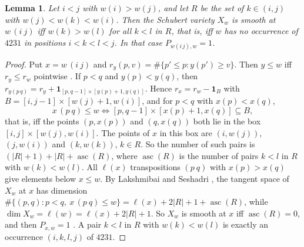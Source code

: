 \documentclass[11pt]{amsart}
\newtheorem{lemma}[theorem]{Lemma}
\theoremstyle{definition}
\theoremstyle{remark}
\begin{document}
\begin{lemma}\label{lem:smoothswap}
Let $i<j$ with $w(i)>w(j)$, and let $R$ be the set of $k\in(i,j)$ with $w(j)<w(k)<w(i)$. Then the Schubert variety $X_w$ is smooth at $w\,(i\ j)$ iff $w(k)>w(l)$ for all $k<l$ in $R$, that is, iff $w$ has no occurrence of $4231$ in positions $i<k<l<j$. In that case $P_{w(i\,j),w}=1$.
\end{lemma}

\begin{proof}
Put $x=w\,(i\ j)$ and $r_y(p,v)=\#\{p'\le p:y(p')\ge v\}$. Then $y\le w$ iff $r_y\le r_w$ pointwise \cite[Thm.~2.1.5]{BjBr}. If $p<q$ and $y(p)<y(q)$, then $r_{y(p\,q)}=r_y+\mathbf 1_{[p,q-1]\times[y(p)+1,y(q)]}$. Hence $r_x=r_w-\mathbf 1_B$ with $B=[i,j-1]\times[w(j)+1,w(i)]$, and for $p<q$ with $x(p)<x(q)$,
\[
x\,(p\ q)\le w\iff[p,q-1]\times[x(p)+1,x(q)]\subseteq B,
\]
that is, iff the points $(p,x(p))$ and $(q,x(q))$ both lie in the box $[i,j]\times[w(j),w(i)]$. The points of $x$ in this box are $(i,w(j))$, $(j,w(i))$ and $(k,w(k))$, $k\in R$. So the number of such pairs is $(|R|+1)+|R|+\operatorname{asc}(R)$, where $\operatorname{asc}(R)$ is the number of pairs $k<l$ in $R$ with $w(k)<w(l)$. All $\ell(x)$ transpositions $(p\ q)$ with $x(p)>x(q)$ give elements below $x\le w$. By Lakshmibai and Seshadri \cite{LSe}, the tangent space of $X_w$ at $x$ has dimension $\#\{(p,q):p<q,\ x\,(p\ q)\le w\}=\ell(x)+2|R|+1+\operatorname{asc}(R)$, while $\dim X_w=\ell(w)=\ell(x)+2|R|+1$. So $X_w$ is smooth at $x$ iff $\operatorname{asc}(R)=0$, and then $P_{x,w}=1$ \cite{KL80}. A pair $k<l$ in $R$ with $w(k)<w(l)$ is exactly an occurrence $(i,k,l,j)$ of $4231$.
\end{proof}
\end{document}
